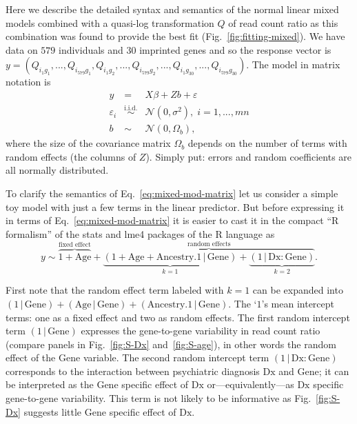 \documentclass[letterpaper]{article}
\begin{document}
Here we describe the detailed syntax and semantics of the normal linear mixed
models combined with a quasi-log transformation \(Q\) of read count ratio as
this combination was found to provide the best fit
(Fig.~\ref{fig:fitting-mixed}).  We have data
on \(579\) individuals and \(30\) imprinted genes and so the response vector is
\(y=(Q_{i_1g_1},...,Q_{i_{579}g_1},Q_{i_1g_2},...,Q_{i_{579}g_2},...,Q_{i_1g_{30}},...,Q_{i_{579}g_{30}})\).
The model in matrix notation is
\begin{eqnarray}
\label{eq:mixed-mod-matrix}
y &=& X \beta + Z b + \varepsilon \\
\varepsilon_i &\overset{\text{i.i.d.}}{\sim}& \mathcal{N}(0, \sigma^2),\;
i=1,...,mn \\
b &\sim& \mathcal{N}(0, \Omega_b),
\end{eqnarray}
where the size of the covariance matrix \(\Omega_b\) depends on the number of
terms with random effects (the columns of \(Z\)).  Simply put: errors and
random coefficients are all normally distributed.

To clarify the semantics of Eq.~\ref{eq:mixed-mod-matrix} let us consider a
simple toy model with just a few terms in the linear predictor.  But before
expressing it in terms of Eq.~\ref{eq:mixed-mod-matrix} it is easier
to cast it in the compact ``R formalism'' of the stats and lme4 packages of the R
language as
\begin{equation}
\label{eq:toy-mod-r}
y \sim \overbrace{1 + \mathrm{Age}}^{\text{fixed effect}} +
\overbrace{\underbrace{(1 + \mathrm{Age} + \mathrm{Ancestry.1} \,|\,
\mathrm{Gene})}_{k=1} +
\underbrace{(1 \,|\, \mathrm{Dx}:\mathrm{Gene})}_{k=2}}^{\text{random
effects}}.
\end{equation}

First note that the random effect term labeled with \(k=1\) can be expanded
into \((1 \,|\, \mathrm{Gene}) + (\mathrm{Age}\,|\, \mathrm{Gene}) +
(\mathrm{Ancestry.1} \,|\, \mathrm{Gene})\).  The `\(1\)'s mean intercept
terms: one as a fixed effect and two as random effects.  The first random
intercept term \((1\,|\,\mathrm{Gene})\) expresses the gene-to-gene
variability in read count ratio (compare panels in Fig.~\ref{fig:S-Dx}
and~\ref{fig:S-age}), in other words the random effect of the
\(\mathrm{Gene}\) variable.  The second random intercept term
\((1\,|\,\mathrm{Dx}:\mathrm{Gene})\) corresponds to the interaction between
psychiatric diagnosis \(\mathrm{Dx}\) and \(\mathrm{Gene}\); it can be
interpreted as the \(\mathrm{Gene}\) specific effect of \(\mathrm{Dx}\)
or---equivalently---as \(\mathrm{Dx}\) specific gene-to-gene
variability.  This term is not likely to be informative as Fig.~\ref{fig:S-Dx}
suggests little \(\mathrm{Gene}\) specific effect of \(\mathrm{Dx}\).
\end{document}
